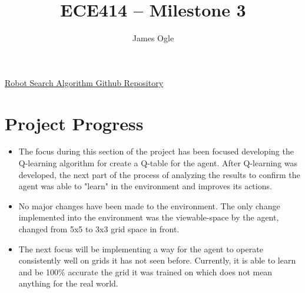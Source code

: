 \documentclass[12pt]{article}
\author{James Ogle}
\title{ECE414 -- Milestone 3}
\begin{document}
    \maketitle
    \begin{center}
        \href{https://github.com/jaogle04/Robot-Search-Algo/tree/master}{Robot Search Algorithm Github Repository}
    \end{center}

    \section*{Project Progress}
    \begin{itemize}
        \item The focus during this section of the project has been focused developing the Q-learning algorithm for create a Q-table for the agent.
        After Q-learning was developed, the next part of the process of analyzing the results to confirm the agent was able to "learn" in the environment and improves its actions.
        \item No major changes have been made to the environment.
        The only change implemented into the environment was the viewable-space by the agent, changed from 5x5 to 3x3 grid space in front.
        \item The next focus will be implementing a way for the agent to operate consistently well on grids it has not seen before.
        Currently, it is able to learn and be 100\% accurate the grid it was trained on which does not mean anything for the real world.
    \end{itemize}

\end{document}
